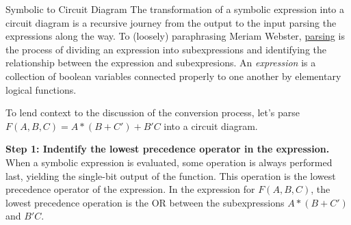 \begin{process}{Symbolic to Circuit Diagram}
The transformation of a symbolic expression into a circuit diagram is a recursive journey
from the output to the input parsing the expressions along the
way.  To (loosely) paraphrasing Meriam Webster, 
\href{https://www.merriam-webster.com/dictionary/parse}{parsing} is the process
of dividing an expression into subexpressions and identifying the relationship
between the expression and subexpresions.  An \textit{expression}  is
a collection of boolean variables connected properly to one another by
elementary logical functions.

To lend context to the discussion of the conversion process, let's parse
$F(A,B,C) = A*(B+C')+B'C$ into a circuit diagram.


\textbf{Step 1: Indentify the lowest precedence operator in the expression.}
When a symbolic expression is evaluated, some operation is always performed last, yielding
the single-bit output of the function.  This operation is the lowest
precedence operator of the expression.  In the expression for $F(A,B,C)$,
the lowest precedence operation is the
OR between the subexpressions $A*(B+C')$ and $B'C$.


\end{process}

